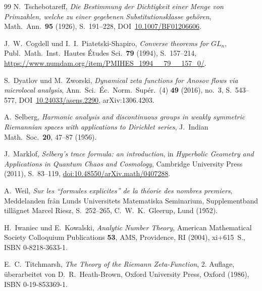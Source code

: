 \documentclass[11pt]{article}
\theoremstyle{definition}
\theoremstyle{remark}
\begin{document}
\begin{thebibliography}{99}
N.~Tschebotareff, \emph{Die Bestimmung der Dichtigkeit einer Menge
von Primzahlen, welche zu einer gegebenen Substitutionsklasse
geh\"oren}, Math.\ Ann.\ \textbf{95} (1926), S.~191--228,
DOI~\href{https://doi.org/10.1007/BF01206606}{10.1007/BF01206606}.

J.~W.~Cogdell und I.~I.~Piatetski-Shapiro, \emph{Converse theorems
for $GL_n$}, Publ.\ Math.\ Inst.\ Hautes \'Etudes Sci.\ \textbf{79}
(1994), S.~157--214,
\url{https://www.numdam.org/item/PMIHES_1994__79__157_0/}.

S.~Dyatlov und M.~Zworski, \emph{Dynamical zeta functions for
Anosov flows via microlocal analysis}, Ann.\ Sci.\ \'Ec.\ Norm.\
Sup\'er.\ (4) \textbf{49} (2016), no.~3, S.~543--577,
DOI~\href{https://doi.org/10.24033/asens.2290}{10.24033/asens.2290},
arXiv:1306.4203.

A.~Selberg, \emph{Harmonic analysis and discontinuous groups in
weakly symmetric Riemannian spaces with applications to Dirichlet
series}, J.\ Indian Math.\ Soc.\ \textbf{20}, 47--87 (1956).

J.~Marklof, \emph{Selberg's trace formula: an introduction}, in
\emph{Hyperbolic Geometry and Applications in Quantum Chaos and
Cosmology}, Cambridge University Press (2011), S.~83--119,
\href{https://doi.org/10.48550/arXiv.math/0407288}{doi:10.48550/arXiv.math/0407288}.

A.~Weil, \emph{Sur les ``formules explicites'' de la th\'eorie des
nombres premiers}, Meddelanden fr\aa n Lunds Universitets
Matematiska Seminarium, Supplementband tillägnet Marcel Riesz,
S.~252--265, C.~W.~K.\ Gleerup, Lund (1952).

H.~Iwaniec und E.~Kowalski, \emph{Analytic Number Theory}, American
Mathematical Society Colloquium Publications \textbf{53}, AMS,
Providence, RI (2004), xi+615~S., ISBN 0-8218-3633-1.

E.~C.~Titchmarsh, \emph{The Theory of the Riemann Zeta-Function},
2. Auflage, überarbeitet von D.~R.~Heath-Brown, Oxford University Press,
Oxford (1986), ISBN 0-19-853369-1.

\end{thebibliography}
\end{document}
